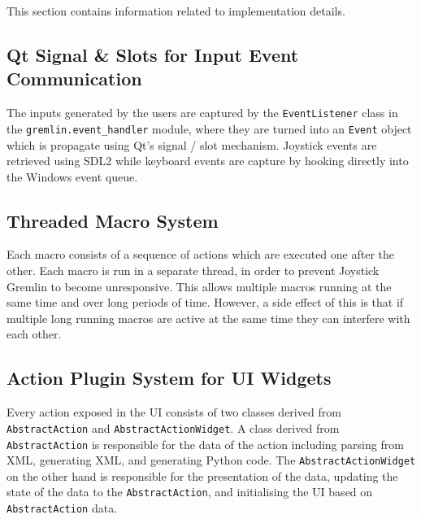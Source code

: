 \documentclass[a4, 10pt]{article}
\newcommand{\JG}{Joystick Gremlin}
\begin{document}
This section contains information related to implementation details.


\subsection{Qt Signal \& Slots for Input Event Communication}

The inputs generated by the users are captured by the
\verb+EventListener+ class in the \verb+gremlin.event_handler+ module,
where they are turned into an \verb+Event+ object which is propagate
using Qt's signal / slot mechanism. Joystick events are retrieved using
SDL2 while keyboard events are capture by hooking directly into the
Windows event queue.


\subsection{Threaded Macro System}

Each macro consists of a sequence of actions which are executed one
after the other. Each macro is run in a separate thread, in order to
prevent \JG{} to become unresponsive. This allows multiple macros
running at the same time and over long periods of time. However, a side
effect of this is that if multiple long running macros are active at the
same time they can interfere with each other.


\subsection{Action Plugin System for UI Widgets}

Every action exposed in the UI consists of two classes derived from
\texttt{Abstract\allowbreak Action} and \texttt{AbstractActionWidget}. A
class derived from \texttt{AbstractAction} is responsible for the data
of the action including parsing from XML, generating XML, and generating
Python code.  The \texttt{AbstractActionWidget} on the other hand is
responsible for the presentation of the data, updating the state of the
data to the \texttt{AbstractAction}, and initialising the UI based on
\texttt{AbstractAction} data.
\end{document}
